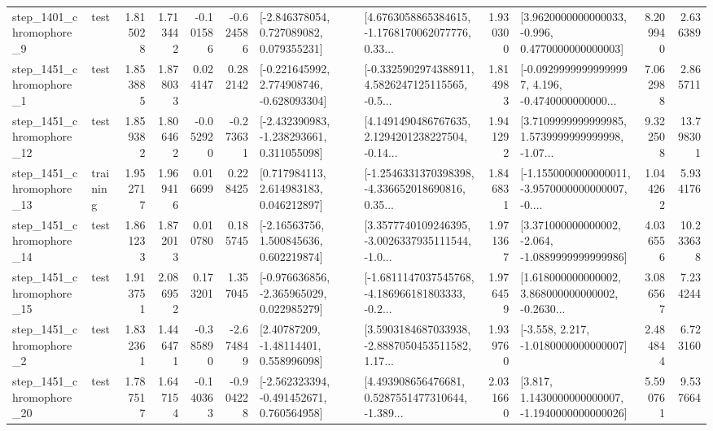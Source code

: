 \begin{tabular}{llrrrrllrlrr}
  step\_1401\_chromophore\_9 &      test &      1.815028 &    1.713442 &     -0.101586 & -0.624586 &    [-2.846378054, 0.727089082, 0.079355231] &  [4.6763058865384615, -1.1768170062077776, 0.33... &       1.930300 &   [3.9620000000000033, -0.996, 0.4770000000000003] &            8.209940 &          2.636389 \\
  step\_1451\_chromophore\_1 &      test &      1.853885 &    1.878033 &      0.024147 &  0.282142 &   [-0.221645992, 2.774908746, -0.628093304] &  [-0.3325902974388911, 4.5826247125115565, -0.5... &       1.814983 &  [-0.09299999999999997, 4.196, -0.4740000000000... &            7.062988 &          2.865711 \\
 step\_1451\_chromophore\_12 &      test &      1.859382 &    1.806462 &     -0.052920 & -0.273631 &   [-2.432390983, -1.238293661, 0.311055098] &  [4.1491490486767635, 2.1294201238227504, -0.14... &       1.941292 &  [3.7109999999999985, 1.5739999999999998, -1.07... &            9.322508 &         13.798301 \\
 step\_1451\_chromophore\_13 &  training &      1.952717 &    1.969416 &      0.016699 &  0.228425 &     [0.717984113, 2.614983183, 0.046212897] &  [-1.2546331370398398, -4.336652018690816, 0.35... &       1.846831 &  [-1.1550000000000011, -3.9570000000000007, -0.... &            1.044262 &          5.934176 \\
 step\_1451\_chromophore\_14 &      test &      1.861233 &    1.872013 &      0.010780 &  0.185745 &     [-2.16563756, 1.500845636, 0.602219874] &  [3.3577740109246395, -3.0026337935111544, -1.0... &       1.971367 &   [3.371000000000002, -2.064, -1.0889999999999986] &            4.036556 &         10.233638 \\
 step\_1451\_chromophore\_15 &      test &      1.913751 &    2.086952 &      0.173201 &  1.357045 &   [-0.976636856, -2.365965029, 0.022985279] &  [-1.6811147037545768, -4.186966181803333, -0.2... &       1.976459 &  [1.618000000000002, 3.868000000000002, -0.2630... &            3.086567 &          7.234244 \\
  step\_1451\_chromophore\_2 &      test &      1.832361 &    1.446471 &     -0.385890 & -2.674849 &      [2.40787209, -1.48114401, 0.558996098] &  [3.5903184687033938, -2.8887050453511582, 1.17... &       1.939760 &               [-3.558, 2.217, -1.0180000000000007] &            2.484844 &          6.723160 \\
 step\_1451\_chromophore\_20 &      test &      1.787517 &    1.647154 &     -0.140363 & -0.904228 &   [-2.562323394, -0.491452671, 0.760564958] &  [4.493908656476681, 0.5287551477310644, -1.389... &       2.031660 &   [3.817, 1.1430000000000007, -1.1940000000000026] &            5.590761 &          9.537664 \\

\end{tabular}

